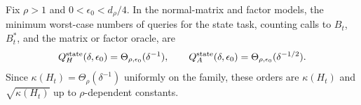 \begin{theorem}\label{thm:lp-state}
Fix $\rho>1$ and $0<\epsilon_0<d_\rho/4$. In the normal-matrix and factor models, the minimum worst-case numbers of queries for the state task, counting calls to $B_t$, $B_t^*$, and the matrix or factor oracle, are
\begin{equation}\label{eq:lp-state-complexity}
 Q_H^{\rm state}(\delta,\epsilon_0)
 =\Theta_{\rho,\epsilon_0}(\delta^{-1}),\qquad
 Q_A^{\rm state}(\delta,\epsilon_0)
 =\Theta_{\rho,\epsilon_0}(\delta^{-1/2}).
\end{equation}
Since $\kappa(H_t)=\Theta_\rho(\delta^{-1})$ uniformly on the family, these orders are $\kappa(H_t)$ and $\sqrt{\kappa(H_t)}$ up to $\rho$-dependent constants.
\end{theorem}
